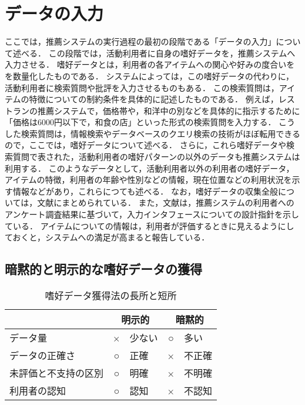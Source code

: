 \chapter{データの入力}
\label{chap:input}

ここでは，推薦システムの実行過程の最初の段階である「データの入力」について述べる．
この段階では，活動利用者に自身の嗜好データを，推薦システムへ入力させる．
嗜好データとは，利用者の各アイテムへの関心や好みの度合いをを数量化したものである．
システムによっては，この嗜好データの代わりに，活動利用者に検索質問や批評を入力させるものもある．
この検索質問は，アイテムの特徴についての制約条件を具体的に記述したものである．
例えば，レストランの推薦システムで，価格帯や，和洋中の別などを具体的に指示するために「価格は6000円以下で，和食の店」といった形式の検索質問を入力する．
こうした検索質問は，情報検索やデータベースのクエリ検索の技術がほぼ転用できるので，ここでは，嗜好データについて述べる．
さらに，これら嗜好データや検索質問で表された，活動利用者の嗜好パターンの以外のデータも推薦システムは利用する．
このようなデータとして，活動利用者以外の利用者の嗜好データ，アイテムの特徴，利用者の年齢や性別などの情報，現在位置などの利用状況を示す情報などがあり，これらにつても述べる．
なお，嗜好データの収集全般については，文献\cite{jjsai:04:05}にまとめられている．
また，文献\cite{sigir:01:01}は，推薦システムの利用者へのアンケート調査結果に基づいて，入力インタフェースについての設計指針を示している．
アイテムについての情報は，利用者が評価するときに見えるようにしておくと，システムへの満足が高まると報告している．

\section{暗黙的と明示的な嗜好データの獲得}
\label{sec:getprefimpexp}

\begin{table}
\centering
\caption{嗜好データ獲得法の長所と短所}
\label{tab:getprefcomp}
\begin{tabular}{l@{\qquad}c@{\,:\,}lc@{\,:\,}l}\toprule
 & \multicolumn{2}{c}{明示的} & \multicolumn{2}{c}{暗黙的} \\\midrule
データ量       & × & 少ない & ○ & 多い \\
データの正確さ & ○ & 正確 & × & 不正確 \\
未評価と不支持の区別 & ○ & 明確 & × & 不明確 \\
利用者の認知   & ○& 認知 & ×& 不認知\\
\bottomrule
\end{tabular}
\end{table}


